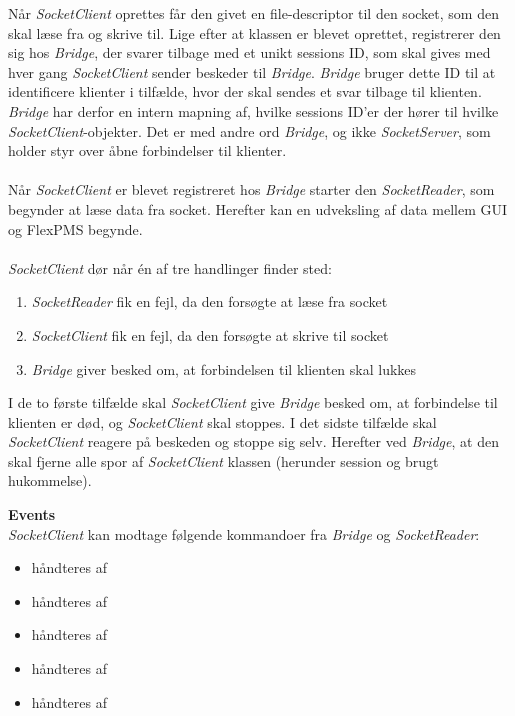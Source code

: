 Når \textit{SocketClient} oprettes får den givet en file-descriptor til den socket, som den skal læse fra og skrive til. Lige efter at klassen er blevet oprettet, registrerer den sig hos \textit{Bridge}, der svarer tilbage med et unikt sessions ID, som skal gives med hver gang \textit{SocketClient} sender beskeder til \textit{Bridge}. \textit{Bridge} bruger dette ID til at identificere klienter i tilfælde, hvor der skal sendes et svar tilbage til klienten. \textit{Bridge} har derfor en intern mapning af, hvilke sessions ID'er der hører til hvilke \textit{SocketClient}-objekter. Det er med andre ord \textit{Bridge}, og ikke \textit{SocketServer}, som holder styr over åbne forbindelser til klienter.\\\\

Når \textit{SocketClient} er blevet registreret hos \textit{Bridge} starter den \textit{SocketReader}, som begynder at læse data fra socket. Herefter kan en udveksling af data mellem GUI og FlexPMS begynde.\\\\

\textit{SocketClient} dør når én af tre handlinger finder sted:

\begin{enumerate}
\item \textit{SocketReader} fik en fejl, da den forsøgte at læse fra socket
\item \textit{SocketClient} fik en fejl, da den forsøgte at skrive til socket
\item \textit{Bridge} giver besked om, at forbindelsen til klienten skal lukkes 
\end{enumerate}

I de to første tilfælde skal \textit{SocketClient} give \textit{Bridge} besked om, at forbindelse til klienten er død, og \textit{SocketClient} skal stoppes. I det sidste tilfælde skal \textit{SocketClient} reagere på beskeden og stoppe sig selv. Herefter ved \textit{Bridge}, at den skal fjerne alle spor af \textit{SocketClient} klassen (herunder session og brugt hukommelse).


\textbf{Events}\\

\textit{SocketClient} kan modtage følgende kommandoer fra \textit{Bridge} og \textit{SocketReader}:

\begin{itemize}
\item {} håndteres af 
\item {} håndteres af 
\item {} håndteres af 
\item {} håndteres af 
\item {} håndteres af 
\end{itemize}

